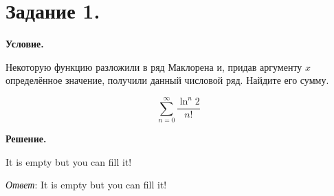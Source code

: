 \section{Задание 1.}

\textbf{Условие.}

Некоторую функцию разложили в ряд Маклорена и, придав аргументу $x$ определённое значение, получили 
данный числовой ряд. Найдите его сумму.

\[\sum_{n = 0}^\infty \frac{\ln^n 2}{n!}\]

\vspace{10mm}

\textbf{Решение.}

It is empty but you can fill it!

\textit{Ответ}:  It is empty but you can fill it!

\clearpage
